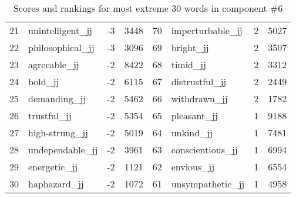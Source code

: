 \begin{table}[tbp]
\begin{tabular}{| rlr@{.}l | rlr@{.}l |}
    21 & unintelligent\_jj & -3 & 3448    &    70 & imperturbable\_jj & 2 & 5027 \\
    22 & philosophical\_jj & -3 & 3096    &    69 & bright\_jj & 2 & 3507 \\
    23 & agreeable\_jj & -2 & 8422    &    68 & timid\_jj & 2 & 3312 \\
    24 & bold\_jj & -2 & 6115    &    67 & distrustful\_jj & 2 & 2449 \\
    25 & demanding\_jj & -2 & 5462    &    66 & withdrawn\_jj & 2 & 1782 \\
    26 & trustful\_jj & -2 & 5354    &    65 & pleasant\_jj & 1 & 9188 \\
    27 & high-strung\_jj & -2 & 5019    &    64 & unkind\_jj & 1 & 7481 \\
    28 & undependable\_jj & -2 & 3961    &    63 & conscientious\_jj & 1 & 6994 \\
    29 & energetic\_jj & -2 & 1121    &    62 & envious\_jj & 1 & 6554 \\
    30 & haphazard\_jj & -2 & 1072    &    61 & unsympathetic\_jj & 1 & 4958 \\
    \hline
    \end{tabular}
    \caption{Scores and rankings for most extreme 30 words in component \#6} 
\end{table}
\clearpage
